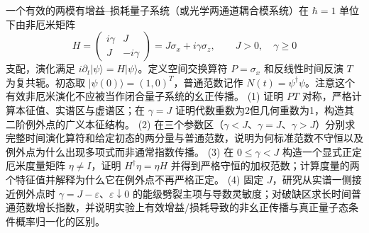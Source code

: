 一个有效的两模有增益--损耗量子系统（或光学两通道耦合模系统）在 \(\hbar=1\) 单位下由非厄米矩阵
\[
H=\begin{pmatrix}i\gamma&J\\ J&-i\gamma\end{pmatrix}
=J\sigma_x+i\gamma\sigma_z,\qquad J>0,\quad\gamma\ge0
\]
支配，演化满足 \(i\partial_t|\psi\rangle=H|\psi\rangle\)。定义空间交换算符 \(P=\sigma_x\) 和反线性时间反演 \(T\) 为复共轭。初态取 \(|\psi(0)\rangle=(1,0)^T\)，普通范数记作 \(N(t)=\psi^\dagger\psi\)。注意这个有效非厄米演化不应被当作闭合量子系统的幺正传播。
(1) 证明 \(PT\) 对称，严格计算本征值、实谱区与虚谱区；在 \(\gamma=J\) 证明代数重数为2但几何重数为1，构造其二阶例外点的广义本征结构。
(2) 在三个参数区（\(\gamma<J\)、\(\gamma=J\)、\(\gamma>J\)）分别求完整时间演化算符和给定初态的两分量与普通范数，说明为何标准范数不守恒以及例外点为什么出现多项式而非通常指数传播。
(3) 在 \(0\le\gamma<J\) 构造一个显式正定厄米度量矩阵 \(\eta\ne I\)，证明 \(H^\dagger\eta=\eta H\) 并得到严格守恒的加权范数；计算度量的两个特征值并解释为什么它在例外点不再严格正定。
(4) 固定 \(J\)，研究从实谱一侧接近例外点时 \(\gamma=J-\varepsilon\)、\(\varepsilon\downarrow0\) 的能级劈裂主项与导数灵敏度；对破缺区求长时间普通范数增长指数，并说明实验上有效增益/损耗导致的非幺正传播与真正量子态条件概率归一化的区别。